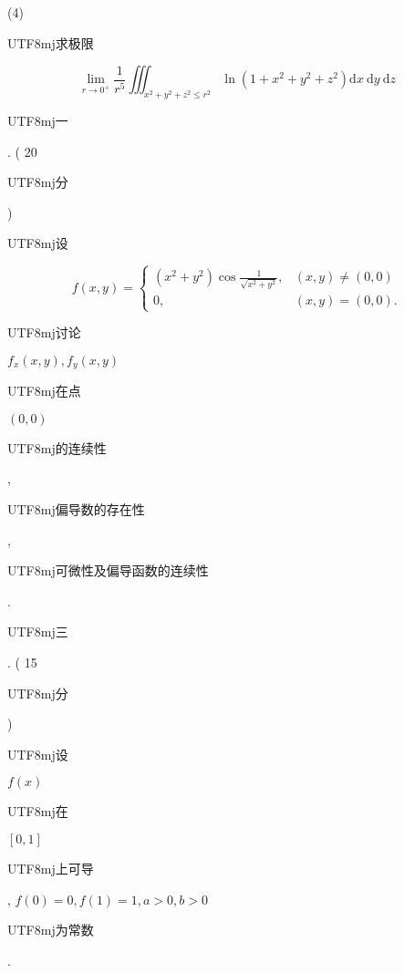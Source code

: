 \documentclass[10pt]{article}
\begin{document}
(4) \begin{CJK}{UTF8}{mj}求极限\end{CJK}
$$
\lim _{r \rightarrow 0^{+}} \frac{1}{r^{5}} \iiint_{x^{2}+y^{2}+z^{2} \leqslant r^{2}} \ln \left(1+x^{2}+y^{2}+z^{2}\right) \mathrm{d} x \mathrm{~d} y \mathrm{~d} z
$$
\begin{CJK}{UTF8}{mj}一\end{CJK}. ( 20 \begin{CJK}{UTF8}{mj}分\end{CJK}) \begin{CJK}{UTF8}{mj}设\end{CJK}
$$
f(x, y)= \begin{cases}\left(x^{2}+y^{2}\right) \cos \frac{1}{\sqrt{x^{2}+y^{2}}}, & (x, y) \neq(0,0) \\ 0, & (x, y)=(0,0) .\end{cases}
$$
\begin{CJK}{UTF8}{mj}讨论\end{CJK} $f_{x}(x, y), f_{y}(x, y)$ \begin{CJK}{UTF8}{mj}在点\end{CJK} $(0,0)$ \begin{CJK}{UTF8}{mj}的连续性\end{CJK}, \begin{CJK}{UTF8}{mj}偏导数的存在性\end{CJK}, \begin{CJK}{UTF8}{mj}可微性及偏导函数的连续性\end{CJK}.

\begin{CJK}{UTF8}{mj}三\end{CJK}. ( 15 \begin{CJK}{UTF8}{mj}分\end{CJK}) \begin{CJK}{UTF8}{mj}设\end{CJK} $f(x)$ \begin{CJK}{UTF8}{mj}在\end{CJK} $[0,1]$ \begin{CJK}{UTF8}{mj}上可导\end{CJK}, $f(0)=0, f(1)=1, a>0, b>0$ \begin{CJK}{UTF8}{mj}为常数\end{CJK}.
\end{document}
